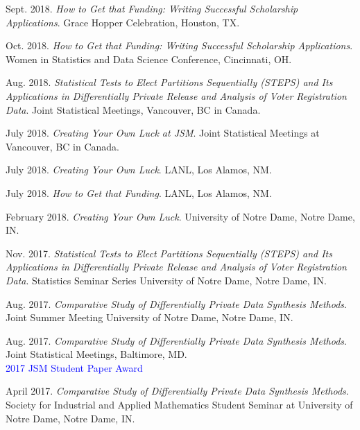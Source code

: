 \begin{etaremune}[topsep=0pt, itemsep=4pt, partopsep=0pt, parsep=0pt]
    \item Sept. 2018. \textit{How to Get that Funding: Writing Successful Scholarship Applications}. Grace Hopper Celebration, Houston, TX.
    
    \item Oct. 2018. \textit{How to Get that Funding: Writing Successful Scholarship Applications}. Women in Statistics and Data Science Conference, Cincinnati, OH.
    
    \item Aug. 2018. \textit{Statistical Tests to Elect Partitions Sequentially (STEPS) and Its Applications in Differentially Private Release and Analysis of Voter Registration Data}. Joint Statistical Meetings, Vancouver, BC in Canada.
    
    \item July 2018. \textit{Creating Your Own Luck at JSM}. Joint Statistical Meetings at Vancouver, BC in Canada.
    
    \item July 2018. \textit{Creating Your Own Luck}. LANL, Los Alamos, NM.
    
    \item July 2018. \textit{How to Get that Funding}. LANL, Los Alamos, NM.
    
    \item February 2018. \textit{Creating Your Own Luck}. University of Notre Dame, Notre Dame, IN.
    
    \item Nov. 2017. \textit{Statistical Tests to Elect Partitions Sequentially (STEPS) and Its Applications in Differentially Private Release and Analysis of Voter Registration Data}. Statistics Seminar Series University of Notre Dame, Notre Dame, IN.
    
    \item Aug. 2017. \textit{Comparative Study of Differentially Private Data Synthesis Methods}. Joint Summer Meeting University of Notre Dame, Notre Dame, IN.
    
    \item Aug. 2017. \textit{Comparative Study of Differentially Private Data Synthesis Methods}. Joint Statistical Meetings, Baltimore, MD.\\
    \textcolor{blue}{2017 JSM Student Paper Award}
    
    \item April 2017. \textit{Comparative Study of Differentially Private Data Synthesis Methods}. Society for Industrial and Applied Mathematics Student Seminar at University of Notre Dame, Notre Dame, IN.
    

\end{etaremune}
